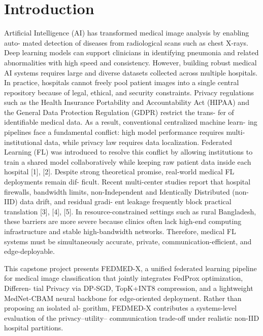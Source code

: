 \chapter{Introduction}
Artificial Intelligence (AI) has transformed medical image analysis by enabling auto- mated detection of diseases from radiological scans such as chest X-rays. Deep learning models can support clinicians in identifying pneumonia and related abnormalities with high speed and consistency. However, building robust medical AI systems requires large and diverse datasets collected across multiple hospitals. In practice, hospitals cannot freely pool patient images into a single central repository because of legal, ethical, and security constraints.
Privacy regulations such as the Health Insurance Portability and Accountability
Act (HIPAA) and the General Data Protection Regulation (GDPR) restrict the trans- fer of identifiable medical data. As a result, conventional centralized machine learn- ing pipelines face a fundamental conflict:
high model performance requires multi- institutional data, while privacy law requires data localization.
Federated Learning (FL) was introduced to resolve this conflict by allowing institutions to train a shared model collaboratively while keeping raw patient data inside each hospital [1], [2].
Despite strong theoretical promise, real-world medical FL deployments remain dif- ficult.
Recent multi-center studies report that hospital firewalls, bandwidth limits, non-Independent and Identically Distributed (non-IID) data drift, and residual gradi- ent leakage frequently block practical translation [3], [4], [5]. In resource-constrained settings such as rural Bangladesh, these barriers are more severe because clinics often lack high-end computing infrastructure and stable high-bandwidth networks. Therefore, medical FL systems must be simultaneously accurate, private, communication-efficient, and edge-deployable.

This capstone project presents FEDMED-X, a unified federated learning pipeline for medical image classification that jointly integrates FedProx optimization, Differen- tial Privacy via DP-SGD, TopK+INT8 compression, and a lightweight MedNet-CBAM neural backbone for edge-oriented deployment. Rather than proposing an isolated al- gorithm, FEDMED-X contributes a systems-level evaluation of the privacy–utility– communication trade-off under realistic non-IID hospital partitions.
